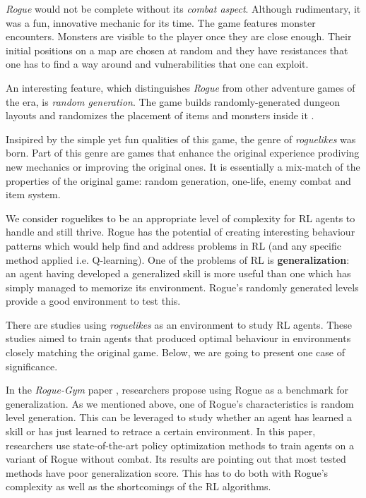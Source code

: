 \emph{Rogue} would not be complete without its \emph{combat aspect}.
Although rudimentary, it was a fun, innovative mechanic for its time.
The game features monster encounters.
Monsters are visible to the player once they are close enough.
Their initial positions on a map are chosen at random and they have resistances that one has to find a way around and vulnerabilities that one can exploit.

An interesting feature, which distinguishes \emph{Rogue} from other adventure games of the era, is \emph{random generation}.
The game builds randomly-generated dungeon layouts and randomizes the placement of items and monsters inside it \cite{wiki:Rogue_(video_game)}.

Insipired by the simple yet fun qualities of this game, the genre of \emph{roguelikes} was born.
Part of this genre are games that enhance the original experience prodiving new mechanics or improving the original ones.
It is essentially a mix-match of the properties of the original game: random generation, one-life, enemy combat and item system.

We consider roguelikes to be an appropriate level of complexity for RL agents to handle and still thrive.
Rogue has the potential of creating interesting behaviour patterns which would help find and address problems in RL (and any specific method applied i.e. Q-learning).
One of the problems of RL is \textbf{generalization}:
an agent having developed a generalized skill is more useful than one which has simply managed to memorize its environment.
Rogue's randomly generated levels provide a good environment to test this.

There are studies using \emph{roguelikes} as an environment to study RL agents.
These studies aimed to train agents that produced optimal behaviour in environments closely matching the original game.
Below, we are going to present one case of significance.

In the \emph{Rogue-Gym} paper \cite{rogue-gym-paper}, researchers propose using Rogue as a benchmark for generalization.
As we mentioned above, one of Rogue's characteristics is random level generation.
This can be leveraged to study whether an agent has learned a skill or has just learned to retrace a certain environment.
In this paper, researchers use state-of-the-art policy optimization methods to train agents on a variant of Rogue without combat.
Its results are pointing out that most tested methods have poor generalization score.
This has to do both with Rogue's complexity as well as the shortcomings of the RL algorithms.